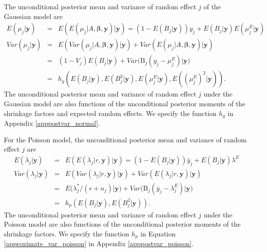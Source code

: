 \documentclass[article]{jss}
\begin{document}
The unconditional posterior mean and variance of random effect $j$ of the Gaussian model are
\begin{eqnarray}
E(\mu_j\vert \boldsymbol{y}) &=&E(E(\mu_{j}\vert A, \boldsymbol{\beta}, \boldsymbol{y})\vert\boldsymbol{y})=(1-E(B_j\vert\boldsymbol{y}))y_j + E(B_j\vert  \boldsymbol{y})E(\mu^E_j\vert  \boldsymbol{y})\label{postmean_normal} \\
Var(\mu_{j}\vert \boldsymbol{y}) &=&  E(Var(\mu_{j}\vert A,  \boldsymbol{\beta}, \boldsymbol{y})\vert \boldsymbol{y})+Var(E(\mu_{j}\vert A, \boldsymbol{\beta}, \boldsymbol{y})\vert \boldsymbol{y})\label{postvar_normal}\\
&=&  (1-V_j)E(B_j\vert  \boldsymbol{y})+Var\big(\textrm{B}_{j}(y_{j}-\mu^E_{j})\vert \boldsymbol{y}\big) \\
&=&h_g(E(B_j\vert\boldsymbol{y}), E(B^2_j\vert\boldsymbol{y}),  E(\mu^E_j\vert\boldsymbol{y}), E((\mu^E_j)^2\vert\boldsymbol{y})).\label{approximate_var_normal}
\end{eqnarray}
The unconditional posterior mean and variance of random effect $j$ under the Gaussian model are also functions of the unconditional posterior moments of the shrinkage factors and expected random effects. We specify the function $h_g$ in Appendix \ref{apppostvar_normal}.


For the Poisson model, the unconditional posterior mean and variance of random effect $j$ are
\begin{eqnarray}
E(\lambda_j\vert \boldsymbol{y}) &=&E(E(\lambda_{j}\vert r, \boldsymbol{y})\vert\boldsymbol{y})=(1-E(B_j\vert\boldsymbol{y}))\bar{y}_j + E(B_j\vert  \boldsymbol{y})\lambda^E\label{postmean_poisson} \\
Var(\lambda_{j}\vert \boldsymbol{y}) &=&  E(Var(\lambda_{j}\vert r,  \boldsymbol{y})\vert \boldsymbol{y})+Var(E(\lambda_{j}\vert r, \boldsymbol{y})\vert \boldsymbol{y})\label{postvar_poisson}\\
&=& E\big(\lambda^{\ast}_{j}/ (r+n_{j})\vert  \boldsymbol{y}\big)+Var\big(\textrm{B}_{j}(\bar{y}_{j}-\lambda^E_{j})\vert \boldsymbol{y}\big) \\
&=&h_p(E(B_j\vert\boldsymbol{y}), E(B^2_j\vert\boldsymbol{y}) ).\label{approximate_var_poisson}
\end{eqnarray}
The unconditional posterior mean and variance of random effect $j$ under the Poisson model are also functions of the unconditional posterior moments of the shrinkage factors. We specify the function $h_p$ in Equation \ref{approximate_var_poisson} in Appendix \ref{apppostvar_poisson}.
\end{document}
